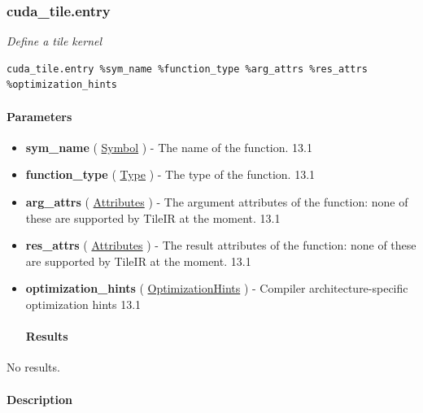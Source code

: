 \documentclass{article}
\begin{document}
\subsubsection{cuda\_tile.entry}

\textit{Define a tile kernel}


\begin{lstlisting}
cuda_tile.entry %sym_name %function_type %arg_attrs %res_attrs %optimization_hints
\end{lstlisting}

\paragraph{Parameters}

\begin{itemize}
\item \textbf{sym\_name} ( \href{https://docs.nvidia.com/cuda/tile-ir/latest/sections/operations.html#type-symbol}{Symbol} ) - The name of the function. 13.1
\item \textbf{function\_type} ( \href{https://docs.nvidia.com/cuda/tile-ir/latest/sections/operations.html#type-type}{Type} ) - The type of the function. 13.1
\item \textbf{arg\_attrs} ( \href{https://docs.nvidia.com/cuda/tile-ir/latest/sections/operations.html#type-attributes}{Attributes} ) - The argument attributes of the function: none of these are supported by TileIR at the moment. 13.1
\item \textbf{res\_attrs} ( \href{https://docs.nvidia.com/cuda/tile-ir/latest/sections/operations.html#type-attributes}{Attributes} ) - The result attributes of the function: none of these are supported by TileIR at the moment. 13.1
\item \textbf{optimization\_hints} ( \href{https://docs.nvidia.com/cuda/tile-ir/latest/sections/operations.html#op-attribute-cuda-tile-entry-optimizationhints-attr}{OptimizationHints} ) - Compiler architecture-specific optimization hints 13.1


\paragraph{Results}

\end{itemize}
No results.



\paragraph{Description}
\end{document}
